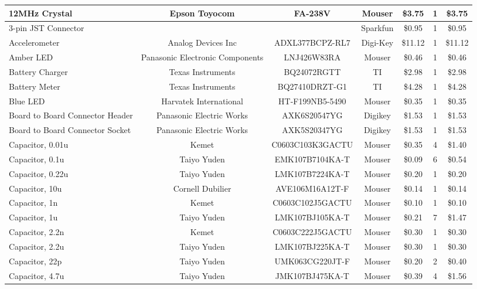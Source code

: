 \begin{landscape}
{\begin{center}
\begin{longtable}{|p{1.5in}|c|c|c|c|c|c|}
    12MHz Crystal & Epson Toyocom & FA-238V & Mouser & \$3.75 & 1     & \$3.75 \\ \hline
    3-pin JST Connector &       &       & Sparkfun & \$0.95 & 1     & \$0.95 \\ \hline
    Accelerometer & Analog Devices Inc & ADXL377BCPZ-RL7 & Digi-Key & \$11.12 & 1     & \$11.12 \\ \hline
    Amber LED & Panasonic Electronic Components & LNJ426W83RA & Mouser & \$0.46 & 1     & \$0.46 \\ \hline
    Battery Charger & Texas Instruments & BQ24072RGTT & TI    & \$2.98 & 1     & \$2.98 \\ \hline
    Battery Meter & Texas Instruments & BQ27410DRZT-G1 & TI    & \$4.28 & 1     & \$4.28 \\ \hline
    Blue LED & Harvatek International & HT-F199NB5-5490 & Mouser & \$0.35 & 1     & \$0.35 \\ \hline
    Board to Board Connector Header & Panasonic Electric Works & AXK6S20547YG & Digikey & \$1.53 & 1     & \$1.53 \\ \hline
    Board to Board Connector Socket & Panasonic Electric Works & AXK5S20347YG & Digikey & \$1.53 & 1     & \$1.53 \\ \hline
    Capacitor, 0.01u & Kemet & C0603C103K3GACTU & Mouser & \$0.35 & 4     & \$1.40 \\ \hline
    Capacitor, 0.1u & Taiyo Yuden & EMK107B7104KA-T & Mouser & \$0.09 & 6     & \$0.54 \\ \hline
    Capacitor, 0.22u & Taiyo Yuden & LMK107B7224KA-T & Mouser & \$0.20 & 1     & \$0.20 \\ \hline
    Capacitor, 10u & Cornell Dubilier & AVE106M16A12T-F & Mouser & \$0.14 & 1     & \$0.14 \\ \hline
    Capacitor, 1n & Kemet & C0603C102J5GACTU & Mouser & \$0.10 & 1     & \$0.10 \\ \hline
    Capacitor, 1u & Taiyo Yuden & LMK107BJ105KA-T & Mouser & \$0.21 & 7     & \$1.47 \\ \hline
    Capacitor, 2.2n & Kemet & C0603C222J5GACTU & Mouser & \$0.30 & 1     & \$0.30 \\ \hline
    Capacitor, 2.2u & Taiyo Yuden & LMK107BJ225KA-T & Mouser & \$0.30 & 1     & \$0.30 \\ \hline
    Capacitor, 22p & Taiyo Yuden & UMK063CG220JT-F & Mouser & \$0.20 & 2     & \$0.40 \\ \hline
    Capacitor, 4.7u & Taiyo Yuden & JMK107BJ475KA-T & Mouser & \$0.39 & 4     & \$1.56 \\ \hline

\end{longtable}
\end{center}}
\end{landscape}
